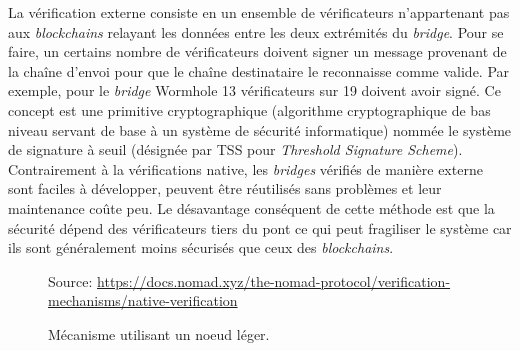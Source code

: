 \pagebreak

La vérification externe consiste en un ensemble de vérificateurs n’appartenant pas aux \textit{\gls{blockchain}s} relayant les données entre les deux extrémités du \textit{bridge}. Pour se faire, un certains nombre de vérificateurs doivent signer un message provenant de la chaîne d’envoi pour que le chaîne destinataire le reconnaisse comme valide. Par exemple, pour le \textit{bridge} \gls{Wormhole} 13 vérificateurs sur 19 doivent avoir signé\cite{NomadDocsExternal}. Ce concept est une primitive cryptographique (algorithme cryptographique de bas niveau servant de base à un système de sécurité informatique) nommée le système de signature à seuil (désignée par TSS pour \textit{Threshold Signature Scheme})\cite{BinanceTSS}. 
Contrairement à la vérifications native, les \textit{bridges} vérifiés de manière externe sont faciles à développer, peuvent être réutilisés sans problèmes et leur maintenance coûte peu. Le désavantage conséquent de cette méthode est que la sécurité dépend des vérificateurs tiers du pont ce qui peut fragiliser le système car ils sont généralement moins sécurisés que ceux des \textit{\gls{blockchain}s}. \\


\begin{figure}[h!]
    \centering
{}
    {\scriptsize
            Source: \url{https://docs.nomad.xyz/the-nomad-protocol/verification-mechanisms/native-verification}}
    \caption{Mécanisme utilisant un noeud léger.}
    \label{fig:LightClient}
\end{figure}

\pagebreak


